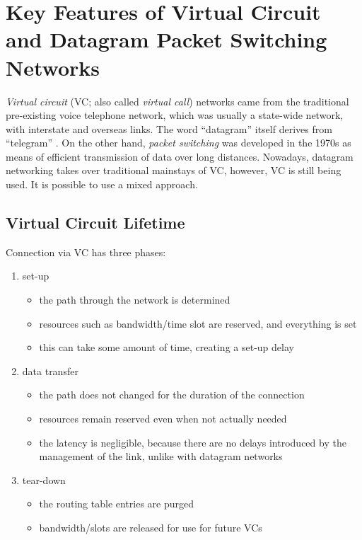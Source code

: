\documentclass[10pt]{report}
\begin{document}
\chapter{Key Features of Virtual Circuit and Datagram Packet Switching Networks}
\thispagestyle{fancy}


{\em Virtual circuit} (VC; also called {\em virtual call}) networks came from the
traditional pre-existing voice telephone network, which was usually a state-wide
network, with interstate and overseas links.  The word ``datagram'' itself
derives from ``telegram'' \cite[p141]{russell}.  On the other hand, {\em packet
switching} was developed in the 1970s as means of efficient transmission of data
over long distances.  Nowadays, datagram networking takes over traditional mainstays of VC,
however, VC is still being used.  It is possible to use a mixed approach.

\section{Virtual Circuit Lifetime}

Connection via VC has three phases:

\begin{enumerate}
\item set-up
    \begin{itemize}
    \item the path through the network is determined
    \item resources such as bandwidth/time slot are reserved, and everything is set
    \item this can take some amount of time, creating a set-up delay
    \end{itemize}
\item data transfer
    \begin{itemize}
    \item the path does not changed for the duration of the connection
    \item resources remain reserved even when not actually needed
    \item the latency is negligible, because there are no delays introduced by the management of the link, unlike with datagram networks
    \end{itemize}
\item tear-down
    \begin{itemize}
	\item the routing table entries are purged
	\item bandwidth/slots are released for use for future VCs
    \end{itemize}
\end{enumerate}
\end{document}
